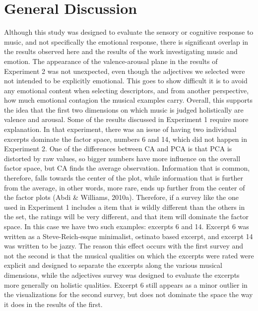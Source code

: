 \documentclass[
  english,
  man,floatsintext]{apa6}
\begin{document}
\hypertarget{general-discussion}{%
\section{General Discussion}\label{general-discussion}}

Although this study was designed to evaluate the sensory or cognitive response to music, and not specifically the emotional response, there is significant overlap in the results observed here and the results of the work investigating music and emotion. The appearance of the valence-arousal plane in the results of Experiment 2 was not unexpected, even though the adjectives we selected were not intended to be explicitly emotional. This goes to show difficult it is to avoid any emotional content when selecting descriptors, and from another perspective, how much emotional contagion the musical examples carry. Overall, this supports the idea that the first two dimensions on which music is judged holistically are valence and arousal.
Some of the results discussed in Experiment 1 require more explanation. In that experiment, there was an issue of having two individual excerpts dominate the factor space, numbers 6 and 14, which did not happen in Experiment 2. One of the differences between CA and PCA is that PCA is distorted by raw values, so bigger numbers have more influence on the overall factor space, but CA finds the average observation. Information that is common, therefore, falls towards the center of the plot, while information that is further from the average, in other words, more rare, ends up further from the center of the factor plots (Abdi \& Williams, 2010a). Therefore, if a survey like the one used in Experiment 1 includes a item that is wildly different than the others in the set, the ratings will be very different, and that item will dominate the factor space. In this case we have two such examples: excerpts 6 and 14. Excerpt 6 was written as a Steve-Reich-esque minimalist, ostinato based excerpt, and excerpt 14 was written to be jazzy. The reason this effect occurs with the first survey and not the second is that the musical qualities on which the excerpts were rated were explicit and designed to separate the excerpts along the various musical dimensions, while the adjectives survey was designed to evaluate the excerpts more generally on holistic qualities. Excerpt 6 still appears as a minor outlier in the visualizations for the second survey, but does not dominate the space the way it does in the results of the first.
\end{document}
